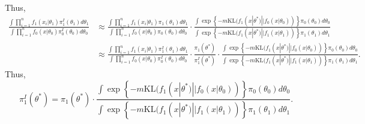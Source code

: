 \documentclass[11pt]{article}
\theoremstyle{plain}
\theoremstyle{definition}
\theoremstyle{remark}
\begin{document}
Thus,
\begin{equation*}
    \begin{split}
    \frac{\int  \prod_{i=1}^n f_1(x_i|\theta_1) \pi_1^I(\theta_1) d\theta_1}{\int \prod_{i=1}^n f_0(x|\theta_0) \pi_0^I(\theta_0) d\theta_0} 
    &\approx
    \frac{\int  \prod_{i=1}^n f_1(x_i|\theta_1) \pi_1(\theta_1) d\theta_1}{\int \prod_{i=1}^n f_0(x|\theta_0) \pi_0(\theta_0) d\theta_0} 
    \cdot
    \frac{\int \exp\left\{-m \text{KL}(f_1(x|\theta^*)||f_0(x|\theta_0))\right\} \pi_0(\theta_0) d\theta_0}
    {\int 
\exp\left\{-m \text{KL}(f_1(x|\theta^*)||f_1(x|\theta_1))\right\}
     \pi_1(\theta_1) d\theta_1}
     \\
     &
    \approx
    \frac{\int  \prod_{i=1}^n f_1(x_i|\theta_1) \pi_1^I(\theta_1) d\theta_1}{\int \prod_{i=1}^n f_0(x|\theta_0) \pi_0^I(\theta_0) d\theta_0} 
    \cdot
    \frac{\pi_1(\theta^*)}{\pi_1^I(\theta^*)}
    \cdot
    \frac{\int \exp\left\{-m \text{KL}(f_1(x|\theta^*)||f_0(x|\theta_0))\right\} \pi_0(\theta_0) d\theta_0}
    {\int 
\exp\left\{-m \text{KL}(f_1(x|\theta^*)||f_1(x|\theta_1))\right\}
     \pi_1(\theta_1) d\theta_1}.
    \end{split}
\end{equation*}
Thus,
\begin{equation*}
    \pi_1^I(\theta^*)=\pi_1(\theta^*)
    \cdot
    \frac{\int \exp\left\{-m \text{KL}(f_1(x|\theta^*)||f_0(x|\theta_0))\right\} \pi_0(\theta_0) d\theta_0}
    {\int 
\exp\left\{-m \text{KL}(f_1(x|\theta^*)||f_1(x|\theta_1))\right\}
     \pi_1(\theta_1) d\theta_1}.
\end{equation*}















\end{document}
